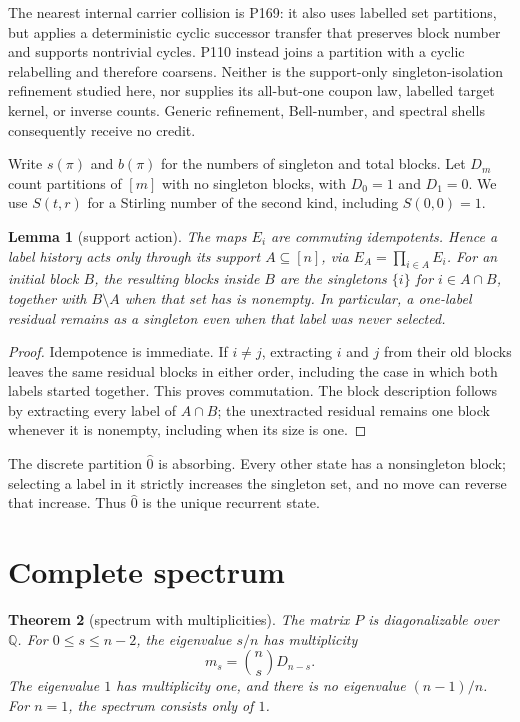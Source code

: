 \documentclass[a4paper,10pt]{amsart}
\newtheorem{theorem}{Theorem}[section]
\newtheorem{lemma}[theorem]{Lemma}
\theoremstyle{remark}
\begin{document}
The nearest internal carrier collision is P169: it also uses labelled set
partitions, but applies a deterministic cyclic successor transfer that
preserves block number and supports nontrivial cycles.  P110 instead joins a
partition with a cyclic relabelling and therefore coarsens.  Neither is the
support-only singleton-isolation refinement studied here, nor supplies its
all-but-one coupon law, labelled target kernel, or inverse counts.  Generic
refinement, Bell-number, and spectral shells consequently receive no credit.

Write $s(\pi)$ and $b(\pi)$ for the numbers of singleton and total blocks.
Let $D_m$ count partitions of $[m]$ with no singleton blocks, with
$D_0=1$ and $D_1=0$.  We use $S(t,r)$ for a Stirling number of the second
kind, including $S(0,0)=1$.

\begin{lemma}[support action]\label{lem:support}
The maps $E_i$ are commuting idempotents.  Hence a label history acts only
through its support $A\subseteq[n]$, via $E_A=\prod_{i\in A}E_i$.
For an initial block $B$, the resulting blocks inside $B$ are the singletons
$\{i\}$ for $i\in A\cap B$, together with $B\setminus A$ when that set has
is nonempty.  In particular, a one-label residual remains as a singleton even
when that label was never selected.
\end{lemma}

\begin{proof}
Idempotence is immediate.  If $i\ne j$, extracting $i$ and $j$ from their
old blocks leaves the same residual blocks in either order, including the
case in which both labels started together.  This proves commutation.  The
block description follows by extracting every label of $A\cap B$; the
unextracted residual remains one block whenever it is nonempty, including
when its size is one.
\end{proof}

The discrete partition $\widehat 0$ is absorbing.  Every other state has a
nonsingleton block; selecting a label in it strictly increases the singleton
set, and no move can reverse that increase.  Thus $\widehat0$ is the unique
recurrent state.

\section{Complete spectrum}

\begin{theorem}[spectrum with multiplicities]\label{thm:spectrum}
The matrix $P$ is diagonalizable over $\mathbb Q$.  For
$0\le s\le n-2$, the eigenvalue $s/n$ has multiplicity
\begin{equation}\label{eq:mult}
 m_s=\binom ns D_{n-s}.
\end{equation}
The eigenvalue $1$ has multiplicity one, and there is no eigenvalue
$(n-1)/n$.  For $n=1$, the spectrum consists only of $1$.
\end{theorem}
\end{document}
